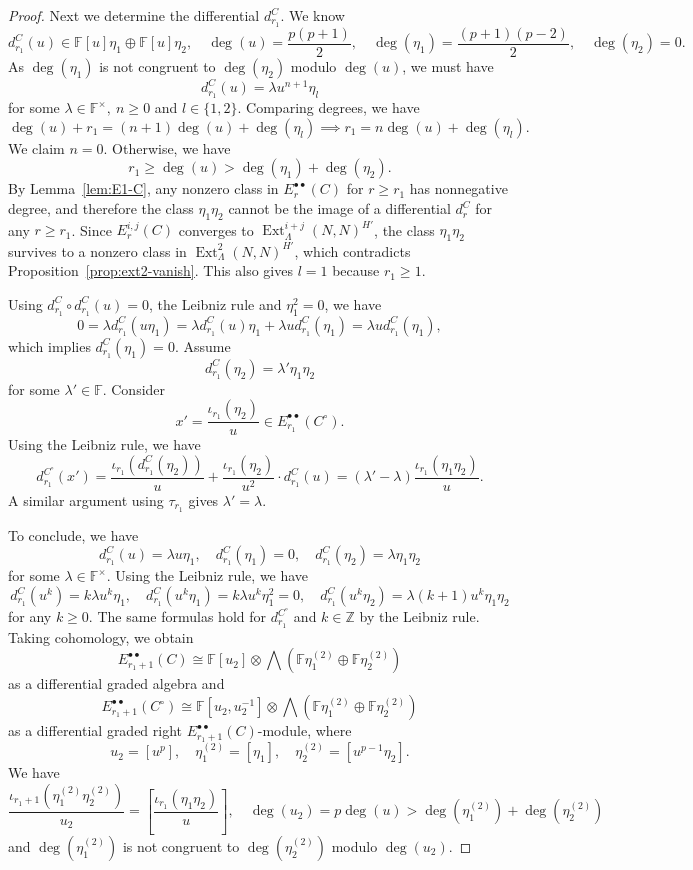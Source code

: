 \documentclass[11pt,a4paper]{article} %
\def\FF{\mathbb{F}}
\def\ZZ{\mathbb{Z}}
\def\deg{\operatorname{deg}}
\def\Ext{\operatorname{Ext}} %
\begin{document}
\begin{proof}
    Next we determine the differential $d_{r_1}^C$. We know 
    \[
    d_{r_1}^C(u)\in\FF[u]\eta_1\oplus\FF[u]\eta_2,\quad\deg(u)=\frac{p(p+1)}{2},\quad\deg(\eta_1)=\frac{(p+1)(p-2)}{2},\quad\deg(\eta_2)=0.
    \]
    As $\deg(\eta_1)$ is not congruent to $\deg(\eta_2)$ modulo $\deg(u)$, we must have
    \[
    d_{r_1}^C(u)=\lambda u^{n+1}\eta_l
    \]
    for some $\lambda\in\FF^\times,~n\ge0$ and $l\in\{1,2\}$. Comparing degrees, we have
    \[
    \deg(u)+r_1=(n+1)\deg(u)+\deg(\eta_l)\implies r_1=n\deg(u)+\deg(\eta_l).
    \]
    We claim $n=0$. Otherwise, we have
    \[
    r_1\ge\deg(u)>\deg(\eta_1)+\deg(\eta_2).
    \]
    By Lemma~\ref{lem:E1-C}, any nonzero class in $E_r^{\bullet\bullet}(C)$ for $r\ge r_1$ has nonnegative degree, and therefore the class $\eta_1\eta_2$ cannot be the image of a differential $d_r^C$ for any $r\ge r_1$. Since $E_r^{i,j}(C)$ converges to $\Ext^{i+j}_{\Lambda}(N,N)^{H'}$, the class $\eta_1\eta_2$ survives to a nonzero class in $\Ext^2_{\Lambda}(N,N)^{H'}$, which contradicts Proposition~\ref{prop:ext2-vanish}. This also gives $l=1$ because $r_1\ge1$.
    
    Using $d_{r_1}^C\circ d_{r_1}^C(u)=0$, the Leibniz rule and $\eta_1^2=0$, we have
    \[
    0=\lambda d_{r_1}^C(u\eta_1)=\lambda d_{r_1}^C(u)\eta_1+\lambda u d_{r_1}^C(\eta_1)=\lambda u d_{r_1}^C(\eta_1),
    \]
    which implies $d_{r_1}^C(\eta_1)=0$. Assume
    \[
    d_{r_1}^C(\eta_2)=\lambda'\eta_1\eta_2
    \]
    for some $\lambda'\in\FF$. Consider
    \[
    x'=\frac{\iota_{r_1}(\eta_2)}{u}\in E_{r_1}^{\bullet\bullet}(C^\circ).
    \]
    Using the Leibniz rule, we have
    \[
    d_{r_1}^{C^\circ}(x')=\frac{\iota_{r_1}\left(d_{r_1}^C(\eta_2)\right)}{u}+\frac{\iota_{r_1}(\eta_2)}{u^2}\cdot d_{r_1}^C(u)=(\lambda'-\lambda)\frac{\iota_{r_1}(\eta_1\eta_2)}{u}.
    \]
    A similar argument using $\tau_{r_1}$ gives $\lambda'=\lambda$. 
    
    To conclude, we have
    \[
    d_{r_1}^C(u)=\lambda u\eta_1,\quad d_{r_1}^C(\eta_1)=0,\quad d_{r_1}^C(\eta_2)=\lambda\eta_1\eta_2
    \]
    for some $\lambda\in\FF^\times$. Using the Leibniz rule, we have
    \[
    d_{r_1}^C(u^k)=k\lambda u^k\eta_1,\quad d_{r_1}^C(u^k\eta_1)=k\lambda u^k\eta_1^2=0,\quad d_{r_1}^C(u^k\eta_2)=\lambda(k+1)u^k\eta_1\eta_2
    \]
    for any $k\ge0$. The same formulas hold for $d_{r_1}^{C^\circ}$ and $k\in\ZZ$ by the Leibniz rule. Taking cohomology, we obtain
    \[
    E_{r_1+1}^{\bullet\bullet}(C)\cong\FF[u_2]\otimes\bigwedge(\FF\eta_1^{(2)}\oplus\FF\eta_2^{(2)})
    \]
    as a differential graded algebra and
    \[
    E_{r_1+1}^{\bullet\bullet}(C^\circ)\cong\FF[u_2,u_2^{-1}]\otimes\bigwedge(\FF\eta_1^{(2)}\oplus\FF\eta_2^{(2)})
    \]
    as a differential graded right $E_{r_1+1}^{\bullet\bullet}(C)$-module, where
    \[
    u_2=[u^p],\quad\eta_1^{(2)}=[\eta_1],\quad\eta_2^{(2)}=[u^{p-1}\eta_2].
    \]
    We have
    \[
    \frac{\iota_{r_1+1}(\eta_1^{(2)}\eta_2^{(2)})}{u_2}=[\frac{\iota_{r_1}(\eta_1\eta_2)}{u}],\quad\deg(u_2)=p\deg(u)>\deg(\eta_1^{(2)})+\deg(\eta_2^{(2)})
    \]
    and $\deg(\eta_1^{(2)})$ is not congruent to $\deg(\eta_2^{(2)})$ modulo $\deg(u_2)$. 
    

\end{proof}
\end{document}
